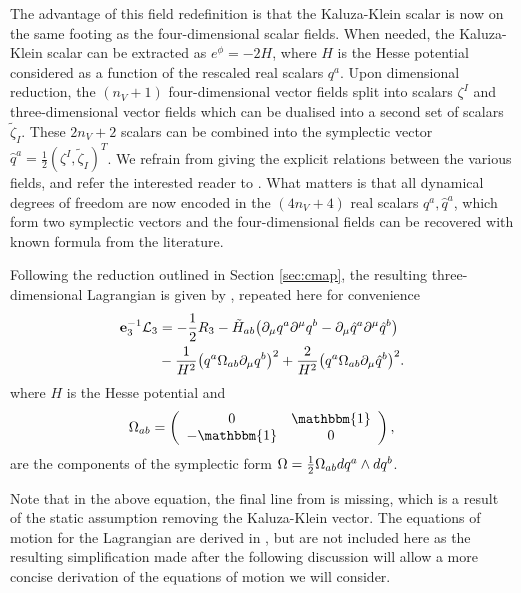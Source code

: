 The advantage of this field redefinition is that the Kaluza-Klein scalar is now on the same footing as the four-dimensional scalar fields. When needed, the Kaluza-Klein scalar can be extracted as $e^\phi = - 2 H$, where $H$ is the Hesse potential considered as a function of the rescaled real scalars $q^a$. Upon dimensional reduction, the $(n_V+1)$ four-dimensional vector fields split into scalars $\zeta^I$ and three-dimensional vector fields which can be dualised into a second set of scalars $\tilde{\zeta}_I$. These $2n_V+2$ scalars can be combined into the symplectic vector $\hat{q}^a = \frac{1}{2} (\zeta^I, \tilde{\zeta}_I)^T$. We refrain from giving the explicit relations between the various fields, and refer the interested reader to \cite{Mohaupt:2011aa, Errington:2014bta, Dempster:2015}. What matters is that all dynamical degrees of freedom are now encoded in the $(4n_V+4)$ real scalars $q^a, \hat{q}^a$, which form two symplectic vectors and the four-dimensional fields can be recovered with known formula from the literature.

Following the reduction outlined in Section \ref{sec:cmap}, the resulting three-dimensional Lagrangian is given by , repeated here for convenience 
\begin{equation*}
\begin{aligned}
 \mathbf{e}_3^{-1} {\cal L}_3 &= -\frac{1}{2}R_3 - \tilde{H}_{ab}\big(\partial_\mu q^a\partial^\mu q^b -  \partial_\mu \hat{q}^a \partial^\mu \hat{q}^b \big) \\
 &- \frac{1}{H^2} \big(q^a\Omega_{ab}\partial_\mu q^b \big)^2 +  \frac{2}{H^2}\big(q^a\Omega_{ab}\partial_\mu \hat{q}^b \big)^2. \\
\end{aligned}
\end{equation*}
where $H$ is the Hesse potential and
\[
 \Omega_{ab} = \left( \begin{array}{cc}
            0 & \mathbbm{1} \\
            - \mathbbm{1} & 0 \\
           \end{array} \right) ,
 \]
are the components of the symplectic form $\Omega = \frac{1}{2} \Omega_{ab} dq^a \wedge dq^b$.
 
Note that in the above equation, the final line from  is missing, which is a result of the static assumption removing the Kaluza-Klein vector. The equations of motion for the Lagrangian  are derived in \cite{Mohaupt:2011aa}, but are not included here as the resulting simplification made after the following discussion will allow a more concise derivation of the equations of motion we will consider.

